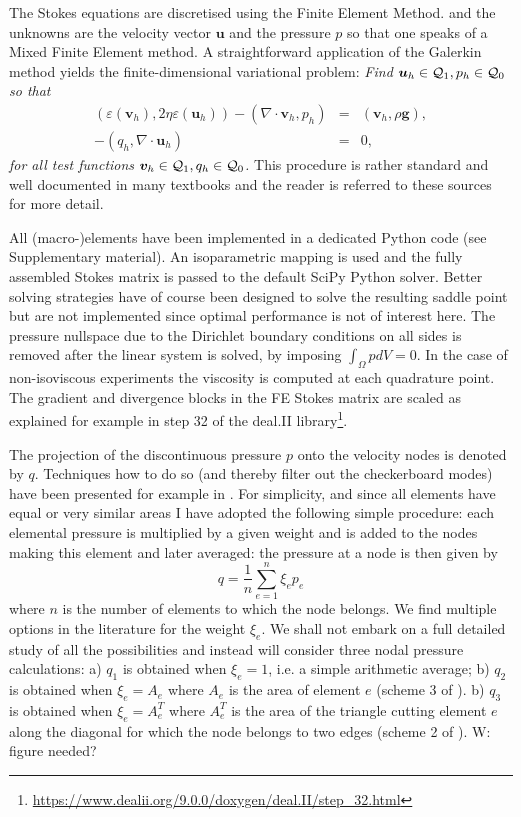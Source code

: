 \documentclass[a4paper,12pt]{article}
\begin{document}
The Stokes equations are discretised using the Finite Element Method.
and the unknowns are the velocity vector ${\bm u}$ and the pressure $p$ so that 
one speaks of a Mixed Finite Element method. 
A straightforward application of the Galerkin method yields the finite-dimensional 
variational problem: 
\textit{Find ${\bm u}_h\in {\cal Q}_1,p_h\in {\cal Q}_0$
so that
\begin{eqnarray}
\label{eq:discrete-formulation}
\left(\varepsilon(\bm v_h), 2\eta \varepsilon(\bm u_h)\right)  
- ( \nabla \cdot \bm v_h, p_h) &=&   ({\bm v}_h,\rho \bm g),\\
-(q_h,\nabla \cdot \bm u_h) &=& 0,
\end{eqnarray}
for all test functions ${\bm v}_h\in {\cal Q}_1, q_h\in {\cal Q}_0$.}
This procedure is rather standard and well documented in many 
textbooks \cite{grsa,dohu03,bobf13} and the reader is referred to these sources 
for more detail.

All (macro-)elements have been implemented in a dedicated Python code (see Supplementary material). 
An isoparametric mapping is used and the fully assembled Stokes matrix is passed to the 
default SciPy Python solver. 
Better solving strategies have of course 
been designed to solve the resulting saddle point \cite{begl05} but are not 
implemented since optimal performance is not of interest here.
The pressure nullspace due to the Dirichlet boundary conditions on all sides is removed 
after the linear system is solved, by imposing $\int_\Omega p dV= 0$.
In the case of non-isoviscous experiments the viscosity is computed at each 
quadrature point. The gradient and divergence blocks in the FE Stokes matrix are
scaled as explained for example in step 32 of the deal.II library\footnote{\url{https://www.dealii.org/9.0.0/doxygen/deal.II/step_32.html}}.

The projection of the discontinuous pressure $p$ onto the velocity nodes is denoted by $q$. 
Techniques how to do so (and thereby filter out the checkerboard modes) have been presented 
for example in \cite{legs79,sagl81a,chpc95,thfb08}.
For simplicity, and since all elements have equal or very similar areas 
I have adopted the following simple procedure: each 
elemental pressure is multiplied by a given weight and is added to the nodes making 
this element and later averaged: the pressure at a node is then given by
\[
q = \frac{1}{n} \sum_{e=1}^{n} \xi_e p_e
\]
where $n$ is the number of elements to which the node belongs.
We find multiple options in the literature for the weight $\xi_e$.
We shall not embark on a full detailed study of all the possibilities 
and instead will consider three nodal pressure calculations:
a) $q_1$ is obtained when $\xi_e=1$, i.e. a simple arithmetic average; 
b) $q_2$ is obtained when $\xi_e=A_e$ where $A_e$ is the area of element $e$
(scheme 3 of \cite{sagl81a}).
b) $q_3$ is obtained when $\xi_e=A_e^T$ where $A_e^T$ is the area of the triangle cutting
element $e$ along the diagonal for which the node belongs to two edges (scheme 2 of \cite{sagl81a}).
{\color{blue} W: figure needed?}
\end{document}
